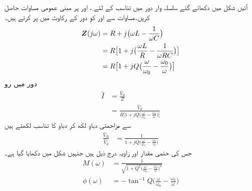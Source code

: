 آئیں شکل  میں دکھائے گئے سلسلہ وار  دور  میں  تناسب کے لئے ،  اور  پر مبنی عمومی مساوات حاصل کریں۔مساوات  سے  اور  کو دور کے رکاوٹ میں  پر کرتے ہیں۔
\begin{align*}
{\ensuremath{{\boldsymbol{Z}}}}(j\omega)&=R+j\big(\omega L-\frac{1}{\omega C}\big)\\
&=R\big[1+j\big(\frac{\omega L}{R} -\frac{1}{\omega RC}\big)\big]\\
&=R\big[1+jQ\big(\frac{\omega}{\omega_0}-\frac{\omega_0}{\omega}\big)\big]
\end{align*}
دور میں رو
\begin{align*}
\hat{I}&=\frac{\hat{V}_d}{Z}\\
&=\frac{\hat{V}_d}{R\big[1+jQ\big(\frac{\omega}{\omega_0}-\frac{\omega_0}{\omega}\big)\big]}
\end{align*}
سے مزاحمتی دباو  لکھ کر دباو کا تناسب لکھتے ہیں
\begin{align*}
\frac{\hat{V}_R}{\hat{V}_d}&=\frac{1}{1+jQ\big(\frac{\omega}{\omega_0}-\frac{\omega_0}{\omega}\big)}
\end{align*}
جس کی حتمی مقدار  اور زاویہ  درج ذیل ہیں جنہیں شکل  میں دکھایا گیا ہے۔
\begin{align}
M(\omega)&=\frac{1}{\sqrt{1+Q^2\big(\frac{\omega}{\omega_0}-\frac{\omega_0}{\omega}\big)^2}}\label{مساوات_تعددی_مقداری_عمومی}\\
\phi(\omega)&=-\tan^{-1} Q\big(\frac{\omega}{\omega_0}-\frac{\omega_0}{\omega}\big)\label{مساوات_تعددی_زاویائی_عمومی}
\end{align}
%
